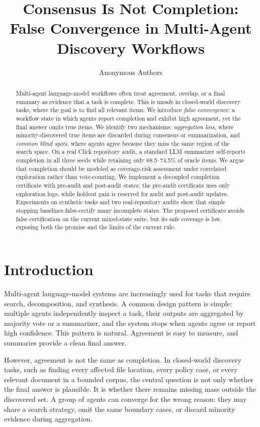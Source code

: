 \documentclass[letterpaper]{article}
\title{Consensus Is Not Completion: False Convergence in Multi-Agent Discovery Workflows}
\author{
    Anonymous Authors
}
\begin{document}
\maketitle

\begin{abstract}
Multi-agent language-model workflows often treat agreement, overlap, or a final
summary as evidence that a task is complete. This is unsafe in closed-world
discovery tasks, where the goal is to find all relevant items. We introduce
\emph{false convergence}: a workflow state in which agents report completion
and exhibit high agreement, yet the final answer omits true items. We identify
two mechanisms: \emph{aggregation loss}, where minority-discovered true items
are discarded during consensus or summarization, and \emph{common blind spots},
where agents agree because they miss the same region of the search space. On a
real Click repository audit, a standard LLM summarizer self-reports completion
in all three seeds while retaining only 68.5--74.5\% of oracle items. We argue
that completion should be modeled as coverage-risk assessment under correlated
exploration rather than vote-counting. We implement a decoupled completion
certificate with pre-audit and post-audit states: the pre-audit certificate uses
only exploration logs, while holdout gain is reserved for audit and post-audit
updates. Experiments on synthetic tasks and two real-repository audits show that
simple stopping baselines false-certify many incomplete states. The proposed
certificate avoids false certification on the current mixed-state suite, but its
safe coverage is low, exposing both the promise and the limits of the current
rule.
\end{abstract}

\section{Introduction}

Multi-agent language-model systems are increasingly used for tasks that require
search, decomposition, and synthesis. A common design pattern is simple:
multiple agents independently inspect a task, their outputs are aggregated by
majority vote or a summarizer, and the system stops when agents agree or report
high confidence. This pattern is natural. Agreement is easy to measure, and
summaries provide a clean final answer.

However, agreement is not the same as completion. In closed-world discovery
tasks, such as finding every affected file location, every policy case, or every
relevant document in a bounded corpus, the central question is not only whether
the final answer is plausible. It is whether there remains missing mass outside
the discovered set. A group of agents can converge for the wrong reason: they
may share a search strategy, omit the same boundary cases, or discard minority
evidence during aggregation.
\end{document}
